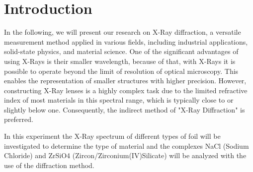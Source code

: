
\chapter{Introduction}
\label{chap:intro}

In the following, we will present our research on X-Ray diffraction, a versatile measurement method applied in various fields, including industrial applications, solid-state physics, and material science. One of the significant advantages of using X-Rays is their smaller wavelength, because of that, with X-Rays it is possible to operate beyond the limit of resolution of optical microscopy. This enables the representation of smaller structures with higher precision. However, constructing X-Ray lenses is a highly complex task due to the limited refractive index of most materials in this spectral range, which is typically close to or slightly below one. Consequently, the indirect method of "X-Ray Diffraction" is preferred.
\bigskip

In this experiment the X-Ray spectrum of different types of foil will be investigated to determine the type of material and the complexes NaCl (Sodium Chloride) and ZrSiO4 (Zircon/Zirconium(IV)Silicate) will be analyzed with the use of the diffraction method.
